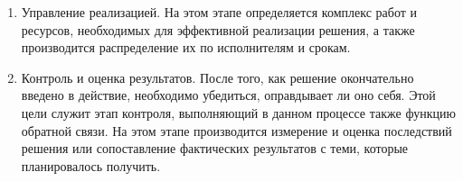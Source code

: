 \documentclass[12pt, russian, oneside, article]{ncc}
\begin{document}
\begin{enumerate}
\item Управление реализацией. На этом этапе определяется комплекс работ и ресурсов, необходимых для эффективной реализации решения, а также производится распределение их по исполнителям и срокам.
\item Контроль и оценка результатов. После того, как решение окончательно введено в действие, необходимо убедиться, оправдывает ли оно себя. Этой цели служит этап контроля, выполняющий в данном процессе также функцию обратной связи. На этом этапе производится измерение и оценка последствий решения или сопоставление фактических результатов с теми, которые планировалось получить.
\end{enumerate}
\end{document}
